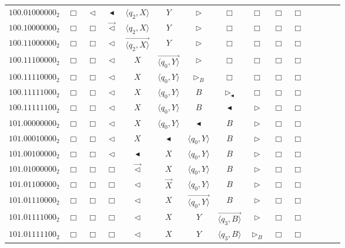 \documentclass[pre,amssymb,showpacs,showkeys,preprint]{revtex4}
\begin{document}
\begin{figure}
\begin{center}
{\begin{tabular}{r|cccccccccccccc}
$100.01000000_2$ & $\Box$ & $\lhd$ & $\blacktriangleleft$ & $\langle q_2,X \rangle$ & $Y$ & $\rhd$ & $\Box$ & $\Box$ & $\Box$ & $\Box$ \\
$100.10000000_2$ & $\Box$ & $\Box$ & $\overrightarrow{\lhd}$ & $\langle q_2,X \rangle$ & $Y$ & $\rhd$ & $\Box$ & $\Box$ & $\Box$ & $\Box$ \\
$100.11000000_2$ & $\Box$ & $\Box$ & $\lhd$ & $\overrightarrow{\langle q_2,X \rangle}$ & $Y$ & $\rhd$ & $\Box$ & $\Box$ & $\Box$ & $\Box$ \\
$100.11100000_2$ & $\Box$ & $\Box$ & $\lhd$ & $X$ & $\overrightarrow{\langle q_0,Y \rangle}$ & $\rhd$ & $\Box$ & $\Box$ & $\Box$ & $\Box$ \\
$100.11110000_2$ & $\Box$ & $\Box$ & $\lhd$ & $X$ & $\langle q_0,Y \rangle$ & $\rhd_B$ & $\Box$ & $\Box$ & $\Box$ & $\Box$ \\
$100.11111000_2$ & $\Box$ & $\Box$ & $\lhd$ & $X$ & $\langle q_0,Y \rangle$ & $B$ & $\rhd_\blacktriangleleft$ & $\Box$ & $\Box$ & $\Box$ \\
$100.11111100_2$ & $\Box$ & $\Box$ & $\lhd$ & $X$ & $\langle q_0,Y \rangle$ & $B$ & $\blacktriangleleft$ & $\rhd$ & $\Box$ & $\Box$ \\
$101.00000000_2$ & $\Box$ & $\Box$ & $\lhd$ & $X$ & $\langle q_0,Y \rangle$ & $\blacktriangleleft$ & $B$ & $\rhd$ & $\Box$ & $\Box$ \\
$101.00010000_2$ & $\Box$ & $\Box$ & $\lhd$ & $X$ & $\blacktriangleleft$ & $\langle q_0,Y \rangle$ & $B$ & $\rhd$ & $\Box$ & $\Box$ \\
$101.00100000_2$ & $\Box$ & $\Box$ & $\lhd$ & $\blacktriangleleft$ & $X$ & $\langle q_0,Y \rangle$ & $B$ & $\rhd$ & $\Box$ & $\Box$ \\
$101.01000000_2$ & $\Box$ & $\Box$ & $\Box$ & $\overrightarrow{\lhd}$ & $X$ & $\langle q_0,Y \rangle$ & $B$ & $\rhd$ & $\Box$ & $\Box$ \\
$101.01100000_2$ & $\Box$ & $\Box$ & $\Box$ & $\lhd$ & $\overrightarrow{X}$ & $\langle q_0,Y \rangle$ & $B$ & $\rhd$ & $\Box$ & $\Box$ \\
$101.01110000_2$ & $\Box$ & $\Box$ & $\Box$ & $\lhd$ & $X$ & $\overrightarrow{\langle q_0,Y \rangle}$ & $B$ & $\rhd$ & $\Box$ & $\Box$ \\
$101.01111000_2$ & $\Box$ & $\Box$ & $\Box$ & $\lhd$ & $X$ & $Y$ & $\overrightarrow{\langle q_3,B \rangle}$ & $\rhd$ & $\Box$ & $\Box$ \\
$101.01111100_2$ & $\Box$ & $\Box$ & $\Box$ & $\lhd$ & $X$ & $Y$ & $\langle q_3,B \rangle$ & $\rhd_B$ & $\Box$ & $\Box$ \\

\end{tabular}}
\end{center}
\end{figure}
\end{document}
